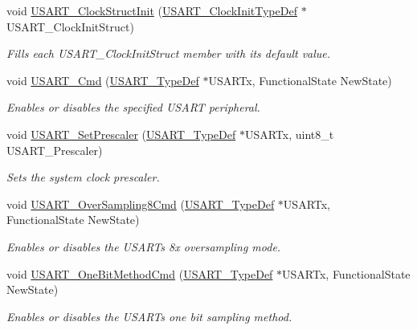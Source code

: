 \begin{DoxyCompactItemize}
void \hyperlink{group___u_s_a_r_t___group1_ga59df27d0adda18b16ee28d47672cc724}{U\+S\+A\+R\+T\+\_\+\+Clock\+Struct\+Init} (\hyperlink{struct_u_s_a_r_t___clock_init_type_def}{U\+S\+A\+R\+T\+\_\+\+Clock\+Init\+Type\+Def} $\ast$U\+S\+A\+R\+T\+\_\+\+Clock\+Init\+Struct)
\begin{DoxyCompactList}\small\item\em Fills each U\+S\+A\+R\+T\+\_\+\+Clock\+Init\+Struct member with its default value. \end{DoxyCompactList}\item 
void \hyperlink{group___u_s_a_r_t___group1_ga45e51626739c5f22a6567c8a85d1d85e}{U\+S\+A\+R\+T\+\_\+\+Cmd} (\hyperlink{struct_u_s_a_r_t___type_def}{U\+S\+A\+R\+T\+\_\+\+Type\+Def} $\ast$U\+S\+A\+R\+Tx, Functional\+State New\+State)
\begin{DoxyCompactList}\small\item\em Enables or disables the specified U\+S\+A\+RT peripheral. \end{DoxyCompactList}\item 
void \hyperlink{group___u_s_a_r_t___group1_gaf5da8f2eee8245425584d85d4f62cc33}{U\+S\+A\+R\+T\+\_\+\+Set\+Prescaler} (\hyperlink{struct_u_s_a_r_t___type_def}{U\+S\+A\+R\+T\+\_\+\+Type\+Def} $\ast$U\+S\+A\+R\+Tx, uint8\+\_\+t U\+S\+A\+R\+T\+\_\+\+Prescaler)
\begin{DoxyCompactList}\small\item\em Sets the system clock prescaler. \end{DoxyCompactList}\item 
void \hyperlink{group___u_s_a_r_t___group1_ga3897bab07491d9239f8a238a9a7cddea}{U\+S\+A\+R\+T\+\_\+\+Over\+Sampling8\+Cmd} (\hyperlink{struct_u_s_a_r_t___type_def}{U\+S\+A\+R\+T\+\_\+\+Type\+Def} $\ast$U\+S\+A\+R\+Tx, Functional\+State New\+State)
\begin{DoxyCompactList}\small\item\em Enables or disables the U\+S\+A\+RT\textquotesingle{}s 8x oversampling mode. \end{DoxyCompactList}\item 
void \hyperlink{group___u_s_a_r_t___group1_ga3ed89ea8765d851510cfe90f7d90cbbb}{U\+S\+A\+R\+T\+\_\+\+One\+Bit\+Method\+Cmd} (\hyperlink{struct_u_s_a_r_t___type_def}{U\+S\+A\+R\+T\+\_\+\+Type\+Def} $\ast$U\+S\+A\+R\+Tx, Functional\+State New\+State)
\begin{DoxyCompactList}\small\item\em Enables or disables the U\+S\+A\+RT\textquotesingle{}s one bit sampling method. \end{DoxyCompactList}\end{DoxyCompactItemize}


